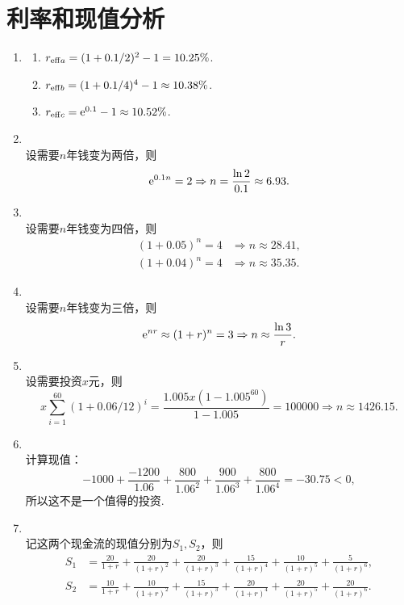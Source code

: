 \section{利率和现值分析}
\begin{enumerate}[label=\arabic{section}.\arabic*]
    \item \sol
    \begin{enumerate}[label=\alph*)]
        \item $r_{\mathrm{eff} a}=(1+0.1/2)^2-1=10.25\%$.
        \item $r_{\mathrm{eff} b}=(1+0.1/4)^4-1 \approx 10.38\%$.
        \item $r_{\mathrm{eff} c}=\mathrm{e}^{0.1}-1 \approx 10.52\%$.
    \end{enumerate}
    \item \sol\\
    设需要$n$年钱变为两倍，则
    \[\mathrm{e}^{0.1n}=2 \Rightarrow n=\frac{\ln 2}{0.1} \approx 6.93.\]
    \item \sol\\
    设需要$n$年钱变为四倍，则
    \begin{align*}
        (1+0.05)^n=4& \Rightarrow n \approx 28.41,\\
        (1+0.04)^n=4& \Rightarrow n \approx 35.35.
    \end{align*}
    \item \sol\\
    设需要$n$年钱变为三倍，则
    \[\mathrm{e}^{nr}\approx(1+r)^n=3 \Rightarrow n \approx \frac{\ln 3}{r}.\]
    \item \sol {\kaishu \textcolor{blue}{注意：每月支付说明有60次投资.}}\\
    设需要投资$x$元，则
    \[x\sum_{i=1}^{60}(1+0.06/12)^i=\frac{1.005x(1-1.005^{60})}{1-1.005}=100000 \Rightarrow n \approx 1426.15.\]
    \item \sol\\
    计算现值：
    \[-1000+\frac{-1200}{1.06}+\frac{800}{1.06^2}+\frac{900}{1.06^3}+\frac{800}{1.06^4}=-30.75<0,\]
    所以这不是一个值得的投资.
    \item \sol\\
    记这两个现金流的现值分别为$S_1,S_2$，则
    \begin{align*}
        S_1 & = \frac{20}{1+r}+\frac{20}{(1+r)^2}+\frac{20}{(1+r)^3}+\frac{15}{(1+r)^4}+\frac{10}{(1+r)^5}+\frac{5}{(1+r)^6},\\
        S_2 & = \frac{10}{1+r}+\frac{10}{(1+r)^2}+\frac{15}{(1+r)^3}+\frac{20}{(1+r)^4}+\frac{20}{(1+r)^5}+\frac{20}{(1+r)^6}.
    \end{align*}

\end{enumerate}
